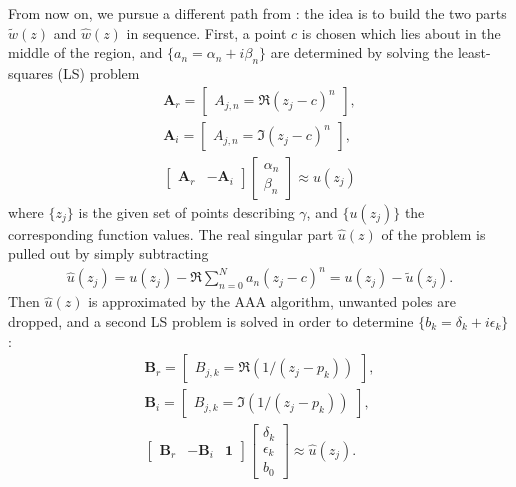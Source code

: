 \documentclass[final,a4paper,onecolumn,3p]{elsarticle}
\begin{document}
From now on, we pursue a different path from \cite{GT19b}: the idea is to build the two parts $\tilde{w}(z)$ and $\hat{w}(z)$ in sequence. First, a point $c$ is chosen which lies about in the middle of the region, and $\{a_n=\alpha_n+i\beta_n\}$ are determined by solving the least-squares (LS) problem
\begin{align}
	\mathbf{A}_r = \begin{bmatrix}
		A_{j,n}=\Re(z_j-c)^n
	\end{bmatrix}, \\
	\mathbf{A}_i = \begin{bmatrix}
		A_{j,n}=\Im(z_j-c)^n
	\end{bmatrix}, \\
	\begin{bmatrix}
		\mathbf{A}_r & -\mathbf{A}_i
	\end{bmatrix}
	\begin{bmatrix}
		\alpha_n \\
		\beta_n
	\end{bmatrix} \approx u(z_j)
\end{align}
where $\{z_j\}$ is the given set of points describing $\gamma$, and $\{u(z_j)\}$ the corresponding function values. The real singular part  $\hat{u}(z)$ of the problem is pulled out by simply subtracting
\begin{align}
	\hat{u}(z_j) = u(z_j)-\Re\sum_{n=0}^{N} a_n(z_j-c)^n = u(z_j)-\tilde{u}(z_j).
\end{align}
Then $\hat{u}(z)$ is approximated by the AAA algorithm, unwanted poles are dropped,  and a second LS problem is solved in order to determine $\{b_k=\delta_k+i\epsilon_k\}$:
\begin{align}
	\mathbf{B}_r = \begin{bmatrix}
			B_{j,k}=\Re(1/(z_j-p_k))
		\end{bmatrix}, \\
	\mathbf{B}_i = \begin{bmatrix}
			B_{j,k}=\Im(1/(z_j-p_k))
		\end{bmatrix}, \\
		\begin{bmatrix}
			\mathbf{B}_r & -\mathbf{B}_i & \mathbf{1}
		\end{bmatrix}
		\begin{bmatrix}
			\delta_k \\
			\epsilon_k \\
			b_0
		\end{bmatrix} \approx \hat{u}(z_j).
\end{align}
\end{document}
